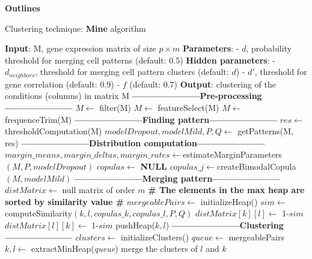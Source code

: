 \documentclass{report}
\begin{document}
{\bigskip
\noindent \textbf{Outlines}
\bigskip

\begin{algorithm}[H]
\caption{Clustering technique: \textbf{Mine} algorithm}
\begin{algorithmic}
\STATE \textbf{Input}: M, gene expression matrix of size $p \times m$
\STATE \textbf{Parameters}: 
\STATE - $d$, probability threshold for merging cell patterns (default: 0.5)
\STATE \textbf{Hidden parameters}: 
\STATE - $d_{neighbors}$, threshold for merging cell pattern clusters (default: $d$)
\STATE - $d'$, threshold for gene correlation (default: $0.9$)
\STATE - $f$ (default: $0.7$)
\STATE \textbf{Output}: clustering of the conditions (columns) in matrix M
\STATE \textbf{---------------------Pre-processing---------------------}
\STATE $M \leftarrow$ filter(M)
\STATE $M \leftarrow$ featureSelect(M)
\STATE $M \leftarrow$ frequenceTrim(M)
\STATE \textbf{---------------------Finding pattern---------------------}
\STATE $res \leftarrow$ thresholdComputation(M)
\STATE $modelDropout, modelMild, P, Q \leftarrow$ getPatterns(M, res)
\STATE \textbf{---------------------Distribution computation---------------------}
\STATE $margin\_means, margin\_deltas, margin\_rates \leftarrow $estimateMarginParameters$(M, P, modelDropout)$
\STATE $copulas \leftarrow$ \textbf{NULL}
\STATE $copulas\_j \leftarrow $createBimodalCopula$(M, modelMild)$
\ENDFOR
\STATE \textbf{---------------------Merging pattern---------------------}
\STATE $distMatrix \leftarrow$ null matrix of order $m$
\STATE \textbf{\# The elements in the max heap are sorted by similarity value \#}
\STATE $mergeablePairs \leftarrow$ initializeHeap()
\STATE $sim \leftarrow $computeSimilarity$(k, l, copulas\_k, copulas\_l, P, Q)$
\STATE $distMatrix[k][l] \leftarrow$ 1-$sim$
\STATE $distMatrix[l][k] \leftarrow$ 1-$sim$
\STATE pushHeap($k,l$)
\ENDIF
\ENDFOR
\ENDFOR
\STATE \textbf{---------------------Clustering---------------------}
\STATE $clusters \leftarrow$ initializeClusters()
\STATE $queue \leftarrow$ mergeablePairs\\
\STATE $k,l \leftarrow$ extractMinHeap(\textit{queue})
\STATE merge the clusters of $l$ and $k$
\ENDIF
\ENDIF
\ENDWHILE
\ENDWHILE
{}
\end{algorithmic}
\end{algorithm}

}
\end{document}
